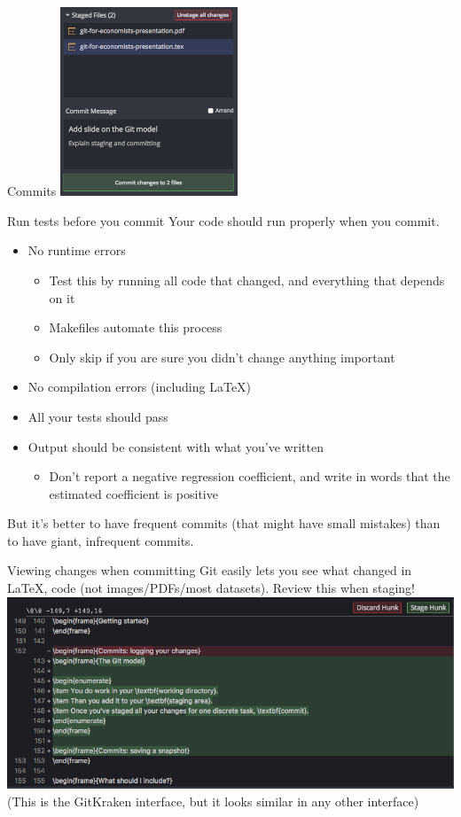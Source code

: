 \documentclass{beamer}
\begin{document}
\begin{frame}{Commits}
\includegraphics[width=200px]{screenshots/committing.png}
\end{frame}

\begin{frame}{Run tests before you commit}
Your code should run properly when you commit.
\begin{itemize}
\item No runtime errors
\begin{itemize}
\item Test this by running all code that changed, and everything that depends on it
\item Makefiles automate this process
\item Only skip if you are sure you didn't change anything important
\end{itemize}
\item No compilation errors (including \LaTeX)
\item All your tests should pass
\item Output should be consistent with what you've written
\begin{itemize}
\item Don't report a negative regression coefficient, and write in words that the estimated coefficient is positive
\end{itemize}
\end{itemize}
But it's better to have frequent commits (that might have small mistakes) than to have giant, infrequent commits.
\end{frame}

\begin{frame}{Viewing changes when committing}
Git easily lets you see what changed in \LaTeX, code (not images/PDFs/most datasets). Review this when staging!
\includegraphics[width=\textwidth]{screenshots/diff.png}
{\small (This is the GitKraken interface, but it looks similar in any other interface)}
\end{frame}
\end{document}
